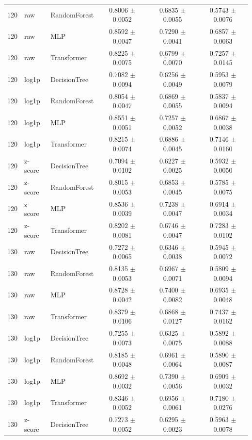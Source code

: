 \begin{longtable}{rllccc}
120 & raw & RandomForest & 0.8006 $\pm$ 0.0052 & 0.6835 $\pm$ 0.0055 & 0.5743 $\pm$ 0.0076 \\
120 & raw & MLP & 0.8592 $\pm$ 0.0047 & 0.7290 $\pm$ 0.0041 & 0.6857 $\pm$ 0.0063 \\
120 & raw & Transformer & 0.8225 $\pm$ 0.0075 & 0.6799 $\pm$ 0.0070 & 0.7257 $\pm$ 0.0145 \\
120 & log1p & DecisionTree & 0.7082 $\pm$ 0.0094 & 0.6256 $\pm$ 0.0049 & 0.5953 $\pm$ 0.0079 \\
120 & log1p & RandomForest & 0.8054 $\pm$ 0.0047 & 0.6869 $\pm$ 0.0055 & 0.5837 $\pm$ 0.0094 \\
120 & log1p & MLP & 0.8551 $\pm$ 0.0051 & 0.7257 $\pm$ 0.0052 & 0.6867 $\pm$ 0.0038 \\
120 & log1p & Transformer & 0.8215 $\pm$ 0.0074 & 0.6886 $\pm$ 0.0045 & 0.7146 $\pm$ 0.0160 \\
120 & z-score & DecisionTree & 0.7094 $\pm$ 0.0102 & 0.6227 $\pm$ 0.0025 & 0.5932 $\pm$ 0.0050 \\
120 & z-score & RandomForest & 0.8015 $\pm$ 0.0053 & 0.6853 $\pm$ 0.0045 & 0.5785 $\pm$ 0.0075 \\
120 & z-score & MLP & 0.8536 $\pm$ 0.0039 & 0.7238 $\pm$ 0.0047 & 0.6914 $\pm$ 0.0034 \\
120 & z-score & Transformer & 0.8202 $\pm$ 0.0081 & 0.6746 $\pm$ 0.0047 & 0.7283 $\pm$ 0.0102 \\
130 & raw & DecisionTree & 0.7272 $\pm$ 0.0065 & 0.6346 $\pm$ 0.0038 & 0.5945 $\pm$ 0.0072 \\
130 & raw & RandomForest & 0.8135 $\pm$ 0.0053 & 0.6967 $\pm$ 0.0071 & 0.5809 $\pm$ 0.0094 \\
130 & raw & MLP & 0.8728 $\pm$ 0.0042 & 0.7400 $\pm$ 0.0082 & 0.6935 $\pm$ 0.0048 \\
130 & raw & Transformer & 0.8379 $\pm$ 0.0106 & 0.6868 $\pm$ 0.0127 & 0.7437 $\pm$ 0.0162 \\
130 & log1p & DecisionTree & 0.7255 $\pm$ 0.0073 & 0.6325 $\pm$ 0.0075 & 0.5892 $\pm$ 0.0088 \\
130 & log1p & RandomForest & 0.8185 $\pm$ 0.0048 & 0.6961 $\pm$ 0.0064 & 0.5890 $\pm$ 0.0087 \\
130 & log1p & MLP & 0.8692 $\pm$ 0.0032 & 0.7390 $\pm$ 0.0056 & 0.6909 $\pm$ 0.0032 \\
130 & log1p & Transformer & 0.8346 $\pm$ 0.0052 & 0.6956 $\pm$ 0.0061 & 0.7180 $\pm$ 0.0276 \\
130 & z-score & DecisionTree & 0.7273 $\pm$ 0.0052 & 0.6295 $\pm$ 0.0023 & 0.5963 $\pm$ 0.0078 \\

\end{longtable}
